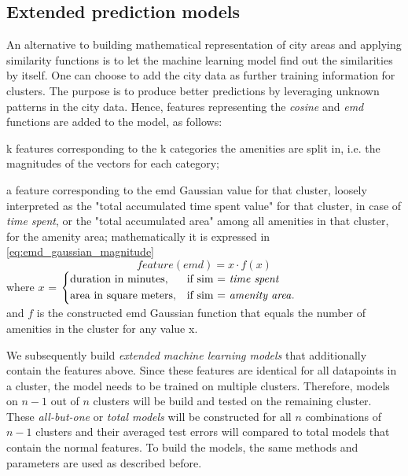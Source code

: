 	\subsection{Extended prediction models}
	An alternative to building mathematical representation of city areas and applying similarity functions is to let the machine learning model find out the similarities by itself. 
	One can choose to add the city data as further training information for clusters. The purpose is to produce better predictions by leveraging unknown patterns in the city data. Hence, features representing the \textit{cosine} and \textit{emd} functions are added to the model, as follows: 
	\begin{romanlist}
		\item k features corresponding to the k categories the amenities are split in, i.e. the magnitudes of the vectors for each category;
		\item a feature corresponding to the emd Gaussian value for that cluster, loosely interpreted as the "total accumulated time spent value" for that cluster, in case of \textit{time spent}, or the "total accumulated area" among all amenities in that cluster, for the amenity area; mathematically it is expressed in \cref{eq:emd_gaussian_magnitude}
		\begin{equation}
		feature(emd)=x \cdot f(x)
		\label{eq:emd_gaussian_magnitude}
		\end{equation}
		{\centering
			where $x$ = 
			$
			\begin{dcases}
			\text{duration in minutes}, & \text{if sim = \textit{time spent}} \\
			\text{area in square meters}, & \text{if sim = \textit{amenity area}}.
			\end{dcases}
			$ \\
			
			and $f$ is the constructed emd Gaussian function that equals the number of amenities in the cluster for any value x.}
	\end{romanlist}
	
	We subsequently build \textit{extended machine learning models} that additionally contain the features above. Since these features are identical for all datapoints in a cluster, the model needs to be trained on multiple clusters. Therefore, models on $n-1$ out of $n$ clusters will be build and tested on the remaining cluster. These \textit{all-but-one} or \textit{total models} will be constructed for all $n$ combinations of $n-1$ clusters and their averaged test errors will compared to total models that contain the normal features. To build the models, the same methods and parameters are used as described before.
	
